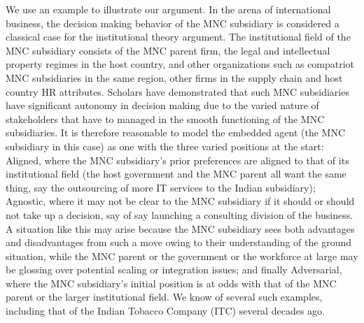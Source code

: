 \documentclass[12pt,letterpaper]{article}
\begin{document}
We use an example to illustrate our argument. In the arena of international business, the decision making behavior of the MNC subsidiary is considered a classical case for the institutional theory argument. The institutional field of the MNC subsidiary consists of the MNC parent firm, the legal and intellectual property regimes in the host country, and other organizations such as compatriot MNC subsidiaries in the same region, other firms in the supply chain and host country HR attributes. Scholars have demonstrated that such MNC subsidiaries have significant autonomy in decision making due to the varied nature of stakeholders that have to managed in the smooth functioning of the MNC subsidiaries. 
It is therefore reasonable to model the embedded agent (the MNC subsidiary in this case) as one with the three varied positions at the start: Aligned, where the MNC subsidiary's prior preferences are aligned to that of its institutional field (the host government and the MNC parent all want the same thing, say the outsourcing of more IT services to the Indian subsidiary); Agnostic, where it may not be clear to the MNC subsidiary if it should or should not take up a decision, say of say launching a consulting division of the business. A situation like this may arise because the MNC subsidiary sees both advantages and disadvantages from such a move owing to their understanding of the ground situation, while the MNC parent or the government or the workforce at large may be glossing over potential scaling or integration issues; and finally Adversarial, where the MNC subsidiary's initial position is at odds with that of the MNC parent or the larger institutional field. We know of several such examples, including that of the Indian Tobacco Company (ITC) several decades ago. 
\end{document}

